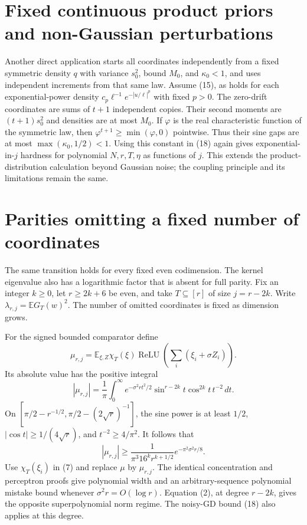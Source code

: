 \documentclass[11pt]{article}
\newcommand{\E}{\mathbb E}\newcommand{\R}{\mathbb R}
\newcommand{\relu}{\operatorname{ReLU}}
\begin{document}
\section{Fixed continuous product priors and non-Gaussian perturbations}
Another direct application starts all coordinates independently from
a fixed symmetric density $q$ with variance $s_0^2$, bound $M_0$,
and $\kappa_0<1$, and uses independent increments from that same law.
Assume (15), as holds for each exponential-power density
$c_p\ell^{-1}e^{-|u/\ell|^p}$ with fixed $p>0$.
The zero-drift coordinates are sums of $t+1$ independent copies.
Their second moments are $(t+1)s_0^2$ and densities are at most $M_0$.
If $\varphi$ is the real characteristic function of the symmetric law,
then $\varphi^{t+1}\ge\min(\varphi,0)$ pointwise.
Thus their sine gaps are at most $\max(\kappa_0,1/2)<1$.
Using this constant in (18) again gives exponential-in-$j$ hardness
for polynomial $N,r,T,\eta$ as functions of $j$.
This extends the product-distribution calculation beyond Gaussian noise;
the coupling principle and its limitations remain the same.

\section{Parities omitting a fixed number of coordinates}
The same transition holds for every fixed even codimension. The kernel
eigenvalue also has a logarithmic factor that is absent for full parity.
Fix an integer $k\ge0$, let $r\ge2k+6$ be even, and take
$T\subseteq[r]$ of size $j=r-2k$. Write $\lambda_{r,j}=\E G_T(w)^2$.
The number of omitted coordinates is fixed as dimension grows.

For the signed bounded comparator define
\[
 \mu_{r,j}=\E_{\xi,Z}\chi_T(\xi)
                    \relu\left(\sum_i(\xi_i+\sigma Z_i)\right).
\]
Its absolute value has the positive integral
\[
 |\mu_{r,j}|=\frac1\pi\int_0^\infty
 e^{-\sigma^2rt^2/2}\sin^{r-2k}t\cos^{2k}t\,t^{-2}\,dt.
 \tag{19}
\]
On $[\pi/2-r^{-1/2},\pi/2-(2\sqrt r)^{-1}]$, the sine power is
at least $1/2$, $|\cos t|\ge1/(4\sqrt r)$, and $t^{-2}\ge4/\pi^2$.
It follows that
\[
 |\mu_{r,j}|\ge\frac{1}{\pi^3 16^k r^{k+1/2}}
                                      e^{-\pi^2\sigma^2r/8}.
 \tag{20}
\]
Use $\chi_T(\xi_i)$ in (7) and replace $\mu$ by $\mu_{r,j}$.
The identical concentration and perceptron proofs give polynomial
width and an arbitrary-sequence polynomial mistake bound whenever
$\sigma^2r=O(\log r)$. Equation (2), at degree $r-2k$, gives the
opposite superpolynomial norm regime. The noisy-GD bound (18) also
applies at this degree.
\end{document}
